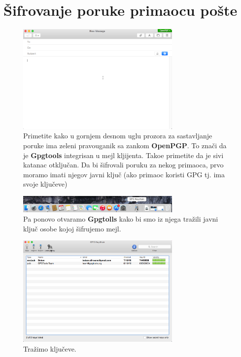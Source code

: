\documentclass[a4paper,11pt]{article}
\begin{document}
\section{\v{S}ifrovanje poruke primaocu po\v{s}te}
\begin{figure}[!h]
	\begin{center}
		\includegraphics[width=8cm]{16_Oracle_VM_VirtualBox.png}
		\caption{Primetite kako u gornjem desnom uglu prozora za sastavljanje poruke ima zeleni pravouganik sa zankom \textbf{OpenPGP}. To zna\v{c}i da je \textbf{Gpgtools} integrisan u mejl kljijenta. Tako\dj{}e primetite da je sivi katanac otklju\v{c}an. Da bi \v{s}ifrovali poruku za nekog primaoca, prvo moramo imati njegov javni klju\v{c} (ako primaoc koristi GPG tj. ima svoje klju\v{c}eve)}
		\label{gpgtools_email_setup6}
	\end{center}
\end{figure}
\begin{figure}[!h]
	\begin{center}
		\includegraphics[width=8cm]{17_Oracle_VM_VirtualBox.png}
		\caption{Pa ponovo otvaramo \textbf{Gpgtolls} kako bi smo iz njega tra\v{z}ili javni klju\v{c} osobe kojoj \v{s}ifrujemo mejl.}
		\label{gpgtools_email_setup7}
	\end{center}
\end{figure}
\newpage
\begin{figure}[!h]
	\begin{center}
		\includegraphics[width=8cm]{18_Oracle_VM_VirtualBox.png}
		\caption{Tra\v{z}imo klju\v{c}eve.}
		\label{gpgtools_email_setup8}
	\end{center}
\end{figure}
\end{document}
